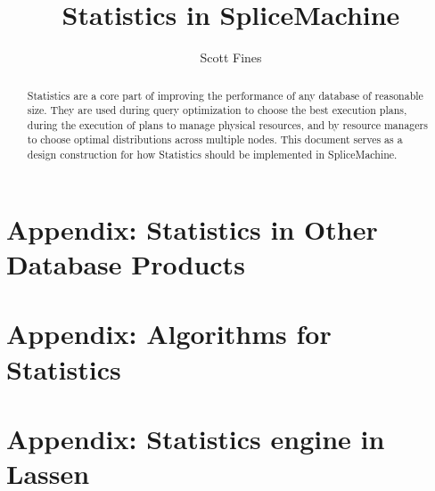 \documentclass[10pt]{amsart}
\begin{document}
\title{Statistics in SpliceMachine}
\author{Scott Fines}

\begin{abstract}
				Statistics are a core part of improving the performance of any database of reasonable size. They are used during query optimization to choose the best execution plans, during the execution of plans to manage physical resources, and by resource managers to choose optimal distributions across multiple nodes. This document serves as a design construction for how Statistics should be implemented in SpliceMachine.
\end{abstract}

\maketitle


\clearpage
\begin{subappendices}
				\label{sec:Appendix}
				\section*{Appendix: Statistics in Other Database Products}
				\label{sec:OtherDBs}
				
				\clearpage
				\section*{Appendix: Algorithms for Statistics}
				\label{sec:Algorithms}
				
				\section*{Appendix: Statistics engine in Lassen}
				\label{sec:Lassen}
				
\end{subappendices}

\clearpage
\printbibliography
\end{document}
